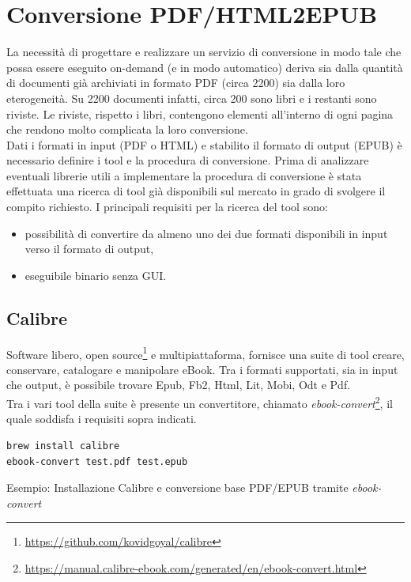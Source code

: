 \section{Conversione PDF/HTML2EPUB}
La necessità di progettare e realizzare un servizio di conversione in modo tale che possa essere eseguito on-demand (e in modo automatico) deriva sia dalla quantità di documenti già archiviati in formato PDF (circa 2200) sia dalla loro eterogeneità. Su 2200 documenti infatti, circa 200 sono libri e i restanti sono riviste. Le riviste, rispetto i libri, contengono elementi all'interno di ogni pagina che rendono molto complicata la loro conversione.\\
Dati i formati in input (PDF o HTML) e stabilito il formato di output (EPUB) è necessario definire i tool e la procedura di conversione. Prima di analizzare eventuali librerie utili a implementare la procedura di conversione è stata effettuata una ricerca di tool già disponibili sul mercato in grado di svolgere il compito richiesto. I principali requisiti per la ricerca del tool sono:
\begin{itemize}
    \item possibilità di convertire da almeno uno dei due formati disponibili in input verso il formato di output,
    \item eseguibile binario senza GUI.
\end{itemize}

\subsection{Calibre}
Software libero, open source\footnote{\url{https://github.com/kovidgoyal/calibre}} e multipiattaforma, fornisce una suite di tool creare, conservare, catalogare e manipolare eBook. Tra i formati supportati, sia in input che output, è possibile trovare Epub, Fb2, Html, Lit, Mobi, Odt e Pdf.\\
Tra i vari tool della suite è presente un convertitore, chiamato \textit{ebook-convert}\footnote{\url{https://manual.calibre-ebook.com/generated/en/ebook-convert.html}}, il quale soddisfa i requisiti sopra indicati.

\begin{listing}[H]
\begin{verbatim}
brew install calibre
ebook-convert test.pdf test.epub
\end{verbatim}
\caption{Esempio: Installazione Calibre e conversione base PDF/EPUB tramite \textit{ebook-convert}}
\end{listing}


